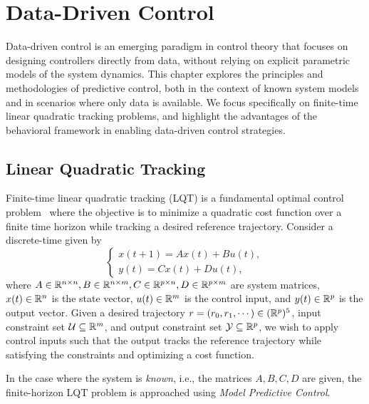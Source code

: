 \chapter{Data-Driven Control}\label{ch:DDC}

Data-driven control is an emerging paradigm in control theory that focuses on designing controllers directly from data, without relying on explicit parametric models of the system dynamics. This chapter explores the principles and methodologies of predictive control, both in the context of known system models and in scenarios where only data is available. We focus specifically on finite-time linear quadratic tracking problems, and highlight the advantages of the behavioral framework in enabling data-driven control strategies.

\section{Linear Quadratic Tracking}
Finite-time linear quadratic tracking (LQT) is a fundamental optimal control problem~\cite{anderson2007} where the objective is to minimize a quadratic cost function over a finite time horizon while tracking a desired reference trajectory. Consider a discrete-time  given by 
\begin{equation}
    \begin{cases}
        x(t+1) = A x(t) + B u(t), \\
        y(t) = C x(t) + D u(t),
    \end{cases}
\end{equation}
where $A \in \mathbb{R}^{n \times n}, B \in \mathbb{R}^{n \times m}, C \in \mathbb{R}^{p \times n}, D \in \mathbb{R}^{p \times m}$ are system matrices, $x(t) \in \mathbb{R}^n$ is the state vector, $u(t) \in \mathbb{R}^m$ is the control input, and $y(t) \in \mathbb{R}^p$ is the output vector. Given a desired trajectory $r = (r_0, r_1, \cdots) \in (\mathbb{R}^p)^5$, input constraint set $\mathcal{U} \subseteq \mathbb{R}^m$, and output constraint set $\mathcal{Y} \subseteq \mathbb{R}^p$, we wish to apply control inputs such that the output tracks the reference trajectory while satisfying the constraints and optimizing a cost function.

In the case where the system is \emph{known}, i.e., the matrices $A, B, C, D$ are given, the finite-horizon LQT problem is approached using \emph{Model Predictive Control}.

